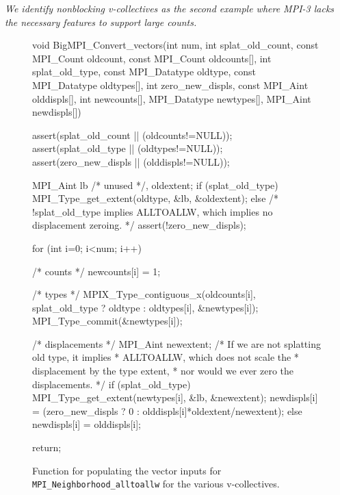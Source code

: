 \textit{We identify nonblocking v-collectives as the second example
where MPI-3 lacks the necessary features to support large counts.}

\begin{figure}
\begin{code}
void BigMPI_Convert_vectors(int num,
                            int splat_old_count,
                            const MPI_Count oldcount,
                            const MPI_Count oldcounts[],
                            int splat_old_type,
                            const MPI_Datatype oldtype,
                            const MPI_Datatype oldtypes[],
                            int zero_new_displs,
                            const MPI_Aint olddispls[],
                            int newcounts[],
                            MPI_Datatype newtypes[],
                            MPI_Aint newdispls[])
{
    assert(splat_old_count || (oldcounts!=NULL));
    assert(splat_old_type  || (oldtypes!=NULL));
    assert(zero_new_displs || (olddispls!=NULL));

    MPI_Aint lb /* unused */, oldextent;
    if (splat_old_type) {
        MPI_Type_get_extent(oldtype, &lb, &oldextent);
    } else {
        /* !splat_old_type implies ALLTOALLW, 
            which implies no displacement zeroing. */
        assert(!zero_new_displs);
    }

    for (int i=0; i<num; i++) {
        /* counts */
        newcounts[i] = 1;

        /* types */
        MPIX_Type_contiguous_x(oldcounts[i], 
                       splat_old_type ? oldtype : oldtypes[i], 
                       &newtypes[i]);
        MPI_Type_commit(&newtypes[i]);

        /* displacements */
        MPI_Aint newextent;
        /* If we are not splatting old type, it implies 
         *  ALLTOALLW, which does not scale the 
         * displacement by the type extent,
         * nor would we ever zero the displacements. */
        if (splat_old_type) {
            MPI_Type_get_extent(newtypes[i], &lb, &newextent);
            newdispls[i] = (zero_new_displs ? 0 : 
                            olddispls[i]*oldextent/newextent);
        } else {
            newdispls[i] = olddispls[i];
        }
    }
    return;
}
\end{code}
\caption{Function for populating the vector inputs 
for \texttt{MPI\_Neighborhood\_alltoallw} for the various v-collectives.}
\label{code:BigMPI_Convert_vectors}
\end{figure}

